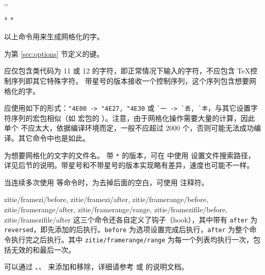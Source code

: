 \documentclass{ctxdoc}
\begin{document}
\begin{function}{\framezi,\framerange,\framezifile}
  \begin{syntax}
     *  
      
     *  
  \end{syntax}
  以上命令用来生成网格化的字。
  
   为第 \ref{sec:options} 节定义的键。

   应仅包含类代码为 11 或 12 的字符，即正常情况下输入的字符，不应包含 \TeX 控制序列即其它特殊字符。 带星号的版本接收一个控制序列，这个序列包含想要网格化的字。

   应使用如下的形式：\verb|"4E00 -> "4E27, "4E30| 或 \verb|`一 -> `丢, `丰|，与其它设置字符序列的宏包相似（如  宏包的 ）。注意，由于网格化操作需要大量的计算，因此单个  不应太大，依据编译环境而定，一般不应超过 2000 个，否则可能无法成功编译。其它命令中也是如此。

   为想要网格化的文字的文件名。 带 \verb|*| 的版本，可在  中使用  设置文件搜索路径，详见后节的说明。带星号和不带星号的版本实现略有差异，速度也可能不一样。

  当连续多次使用  等命令时，为去掉后面的空白，可使用 \opt{\%} 注释符。
\end{function}

\begin{function}{
  zitie/framezi/before, zitie/framezi/after,
  zitie/framerange/before, zitie/framerange/after,
  zitie/framerange/range,
  zitie/framezifile/before, zitie/framezifile/after
}
  这三个命令还各自定义了钩子（hook），其中带有 \verb|after| 为 \verb|reversed|，即先添加的后执行。\verb|before| 为选项设置完成后执行，\verb|after| 为整个命令执行完之后执行。其中 \verb|zitie/framerange/range| 为每一个列表均执行一次，包括无效的和最后一次。

  可以通过 、、 来添加和移除，详细请参考 \cite{pdf-source2e} 或 \cite{pkg-lthooks} 的说明文档。
\end{function}
\end{document}
